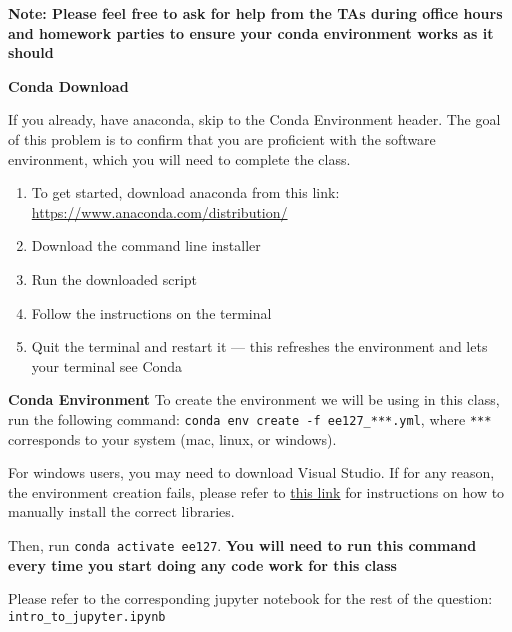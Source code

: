

\textbf{Note: Please feel free to ask for help from the TAs during office hours and homework parties to ensure your conda environment works as it should}


\textbf{Conda Download}

If you already, have anaconda, skip to the Conda Environment header. The goal of this problem is to confirm that you are proficient with the software environment, which you will need to complete the class.

\begin{enumerate}
    
    \item To get started, download anaconda from this link: \url{https://www.anaconda.com/distribution/}
    \item Download the command line installer
    \item Run the downloaded script
    \item Follow the instructions on the terminal
    \item Quit the terminal and restart it --- this refreshes the environment and lets your terminal see Conda
\end{enumerate}

\textbf{Conda Environment}
\newline
To create the environment we will be using in this class, run the following command: \newline
\verb|conda env create -f ee127_***.yml|, where \verb|***| corresponds to your system (mac, linux, or windows).

For windows users, you may need to download Visual Studio. If for any reason, the environment creation fails, please refer to \href{https://docs.google.com/document/d/1jwnYQF0PQSmBKwjOcjl1lVbTwcTOevHr2lW5NS8rsC4/edit?usp=sharing}{this link} for instructions on how to manually install the correct libraries.

Then, run \verb|conda activate ee127|. \textbf{You will need to run this command every time you start doing any code work for this class}

Please refer to the corresponding jupyter notebook for the rest of the question: \verb|intro_to_jupyter.ipynb|